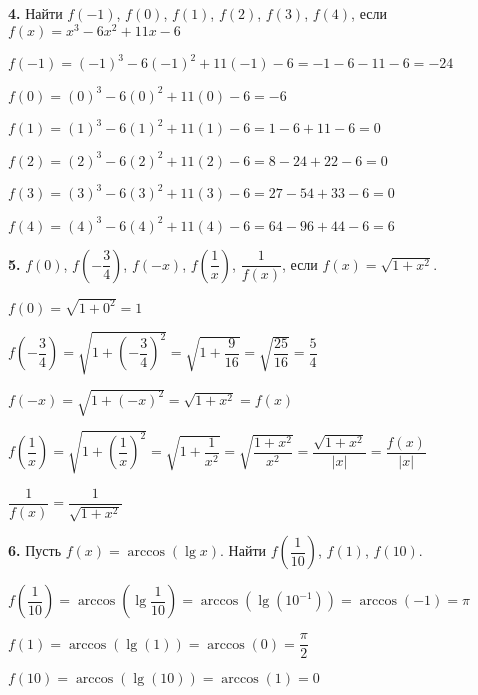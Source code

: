 \documentclass[12pt]{article}
\begin{document}
{\bf 4.} Найти $f(-1)$, $f(0)$, $f(1)$, $f(2)$, $f(3)$, $f(4)$, если $f(x)=x^3-6x^2+11x-6$
	
	\hspace{-3mm}{\tt Решение}
	
	$f(-1) = (-1)^3-6(-1)^2+11(-1)-6 = -1-6-11-6 = -24$
	
	$f(0) = (0)^3-6(0)^2+11(0)-6 = -6$
	
	$f(1)=(1)^3-6(1)^2+11(1)-6 = 1-6+11-6 = 0$
	
	$f(2) = (2)^3-6(2)^2+11(2)-6 = 8-24+22-6 = 0$
	
	$f(3) = (3)^3-6(3)^2+11(3)-6 = 27-54+33-6 = 0$
	
	$f(4) = (4)^3 -6(4)^2+11(4)-6 = 64-96+44-6 = 6$\vspace{2mm}
	
{\bf 5.} $f(0)$, $f\left(-\dfrac{3}{4}\right)$, $f(-x)$, $f\left(\dfrac{1}{x}\right)$, $\dfrac{1}{f(x)}$, если $f(x)=\sqrt{1+x^2}$.

\hspace{-3mm}{\tt Решение}

$f(0) = \sqrt{1+0^2} = 1$\vspace{2mm}

$f\left(-\dfrac{3}{4}\right) = \sqrt{1+\left(-\dfrac{3}{4}\right)^2} = \sqrt{1+\dfrac{9}{16}} = \sqrt{\dfrac{25}{16}} = \dfrac{5}{4}$\vspace{2mm}

$f(-x) = \sqrt{1+(-x)^2} = \sqrt{1+x^2} = f(x)$\vspace{2mm}

$f\left(\dfrac{1}{x}\right) = \sqrt{1+\left(\dfrac{1}{x}\right)^2} = \sqrt{1+\dfrac{1}{x^2}} = \sqrt{\dfrac{1+x^2}{x^2}} = \dfrac{\sqrt{1+x^2}}{|x|} = \dfrac{f(x)}{|x|}$ \vspace{2mm}

$\dfrac{1}{f(x)} = \dfrac{1}{\sqrt{1+x^2}}$

{\bf 6.} Пусть $f(x) = \arccos(\lg x).$ Найти $f\left(\dfrac{1}{10}\right)$, $f(1)$, $f(10)$.

\hspace{-3mm}{\tt Решение.}\vspace{2mm}

$f\left(\dfrac{1}{10}\right)= \arccos(\lg\dfrac{1}{10}) = \arccos(\lg(10^{-1})) = \arccos(-1) = \pi$\vspace{2mm}

$f(1) = \arccos(\lg(1)) = \arccos(0) = \dfrac{\pi}{2}$\vspace{2mm}

$f(10) = \arccos(\lg(10)) = \arccos(1) = 0$\vspace{2mm}
\end{document}
